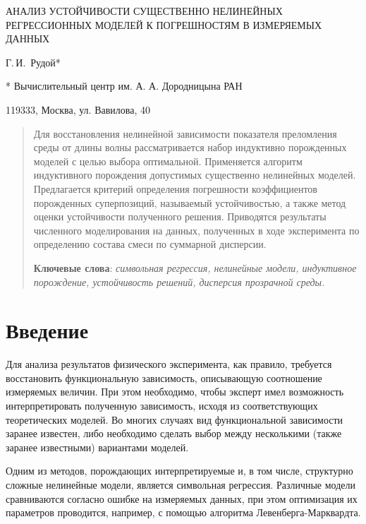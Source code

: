 \documentclass[11pt,a4paper]{article}
\theoremstyle{definition}
\begin{document}
\begin{center}
  АНАЛИЗ УСТОЙЧИВОСТИ СУЩЕСТВЕННО НЕЛИНЕЙНЫХ РЕГРЕССИОННЫХ МОДЕЛЕЙ К ПОГРЕШНОСТЯМ В ИЗМЕРЯЕМЫХ
  ДАННЫХ

  Г.\,И.~Рудой*

  \footnotesize
  * Вычислительный центр им. А. А. Дородницына РАН

  119333, Москва, ул. Вавилова, 40
\end{center}

\begin{abstract}
  Для восстановления нелинейной зависимости показателя преломления среды от длины
  волны рассматривается набор индуктивно порожденных моделей с целью выбора оптимальной.
  Применяется алгоритм индуктивного порождения допустимых существенно
  нелинейных моделей. Предлагается критерий определения погрешности коэффициентов порожденных
  суперпозиций, называемый устойчивостью, а также метод оценки устойчивости полученного решения.
  Приводятся результаты численного моделирования на данных, полученных в ходе
  эксперимента по определению состава смеси по суммарной дисперсии.

  \bigskip
  \textbf{Ключевые слова}: \emph{символьная регрессия, нелинейные модели, индуктивное порождение,
	устойчивость решений, дисперсия прозрачной среды.}
\end{abstract}

\section*{Введение}

Для анализа результатов физического эксперимента, как правило, требуется
восстановить функциональную зависимость, описывающую соотношение измеряемых
величин. При этом необходимо, чтобы эксперт имел возможность интерпретировать
полученную зависимость, исходя из соответствующих теоретических моделей. Во
многих случаях вид функциональной зависимости заранее известен, либо необходимо
сделать выбор между несколькими (также заранее известными) вариантами моделей.

Одним из методов, порождающих интерпретируемые и, в том числе, структурно
сложные нелинейные модели, является
символьная регрессия\cite{davidson_2000_snrea,reference/ml/X10vc,StrijovW10,Strijov08InductMethods,Rudoy13}. Различные
модели сравниваются согласно ошибке на измеряемых данных, при этом оптимизация
их параметров проводится, например, с помощью алгоритма Левенберга-Марквардта\cite{Marquardt1963Algorithm,more_78}.
\end{document}
